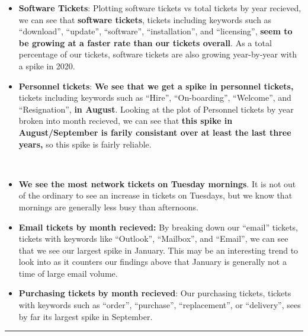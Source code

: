 \documentclass[11pt]{article}
\begin{document}
    \begin{itemize}
\item
  \textbf{Software Tickets}: Plotting software tickets vs total tickets
  by year recieved, we can see that \textbf{software tickets}, tickets
  including keywords such as ``download'', ``update'', ``software'',
  ``installation'', and ``licensing'', \textbf{seem to be growing at a
  faster rate than our tickets overall}. As a total percentage of our
  tickets, software tickets are also growing year-by-year with a spike
  in 2020.
\item
  \textbf{Personnel tickets}: \textbf{We see that we get a spike in
  personnel tickets,} tickets including keywords such as ``Hire'',
  ``On-boarding'', ``Welcome'', and ``Resignation'', \textbf{in August}.
  Looking at the plot of Personnel tickets by year broken into month
  recieved, we can see that \textbf{this spike in August/September is
  farily consistant over at least the last three years,} so this spike
  is fairly reliable.
\end{itemize}

    \begin{center}
    \end{center}
    { \hspace*{\fill} \\}
    
    \begin{itemize}
\item
  \textbf{We see the most network tickets on Tuesday mornings}. It is
  not out of the ordinary to see an increase in tickets on Tuesdays, but
  we know that mornings are generally less busy than afternoons.
\item
  \textbf{Email tickets by month recieved:} By breaking down our
  ``email'' tickets, tickets with keywords like ``Outlook'',
  ``Mailbox'', and ``Email'', we can see that we see our largest spike
  in January. This may be an interesting trend to look into as it
  counters our findings above that January is generally not a time of
  large email volume.
\item
  \textbf{Purchasing tickets by month recieved}: Our purchasing tickets,
  tickets with keywords such as ``order'', ``purchase'',
  ``replacement'', or ``delivery'', sees by far its largest spike in
  September.
\end{itemize}

    \begin{center}\rule{0.5\linewidth}{\linethickness}\end{center}
\end{document}
